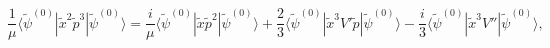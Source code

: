 \begin{equation}
\frac{1}{\mu}\langle \tilde\psi^{(0)}|\tilde  x^2 \tilde p^3
|\tilde\psi^{(0)}\rangle
=\frac{i}{\mu}\langle \tilde\psi^{(0)}|\tilde  x \tilde p^2
|\tilde\psi^{(0)}\rangle
+\frac{2}{3}\langle \tilde\psi^{(0)}|\tilde  x^3 V'\tilde p
|\tilde\psi^{(0)}\rangle
-\frac{i}{3}\langle \tilde\psi^{(0)}|\tilde  x^3V''
|\tilde\psi^{(0)}\rangle,
\nonumber
\end{equation}

